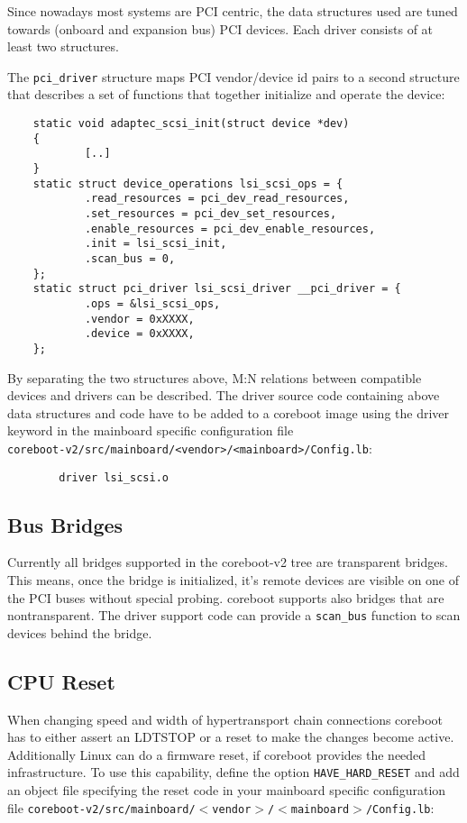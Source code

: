 \documentclass[titlepage,12pt]{article}
\begin{document}
Since nowadays most systems are PCI centric, the data structures used
are tuned towards (onboard and expansion bus) PCI devices. Each driver
consists of at least two structures.

The \texttt{pci\_driver} structure maps PCI vendor/device id pairs to a
second structure that describes a set of functions that together
initialize and operate the device:

\begin{verbatim}
    static void adaptec_scsi_init(struct device *dev)
    {
            [..]
    }
    static struct device_operations lsi_scsi_ops = {
            .read_resources = pci_dev_read_resources,
            .set_resources = pci_dev_set_resources,
            .enable_resources = pci_dev_enable_resources,
            .init = lsi_scsi_init,
            .scan_bus = 0,
    };
    static struct pci_driver lsi_scsi_driver __pci_driver = {
            .ops = &lsi_scsi_ops,
            .vendor = 0xXXXX,
            .device = 0xXXXX,
    };
\end{verbatim}

By separating the two structures above, M:N relations between compatible
devices and drivers can be described. The driver source code containing
above data structures and code have to be added to a coreboot image
using the driver keyword in the mainboard specific configuration file \\
\texttt{coreboot-v2/src/mainboard/<vendor>/<mainboard>/Config.lb}:

\begin{verbatim}
        driver lsi_scsi.o
\end{verbatim}

\subsection{Bus Bridges}

Currently all bridges supported in the coreboot-v2 tree are transparent
bridges. This means, once the bridge is initialized, it's remote devices
are visible on one of the PCI buses without special probing. coreboot
supports also bridges that are nontransparent.  The driver support code
can provide a \texttt{scan\_bus} function to scan devices behind the bridge.

\subsection{CPU Reset}
When changing speed and width of hypertransport chain connections
coreboot has to either assert an LDTSTOP or a reset to make the changes
become active.  Additionally Linux can do a firmware reset, if coreboot
provides the needed infrastructure. To use this capability, define the
option \texttt{HAVE\_HARD\_RESET} and add an object file specifying the
reset code in your mainboard specific configuration file
\texttt{coreboot-v2/src/mainboard/$<$vendor$>$/$<$mainboard$>$/Config.lb}:
\end{document}
